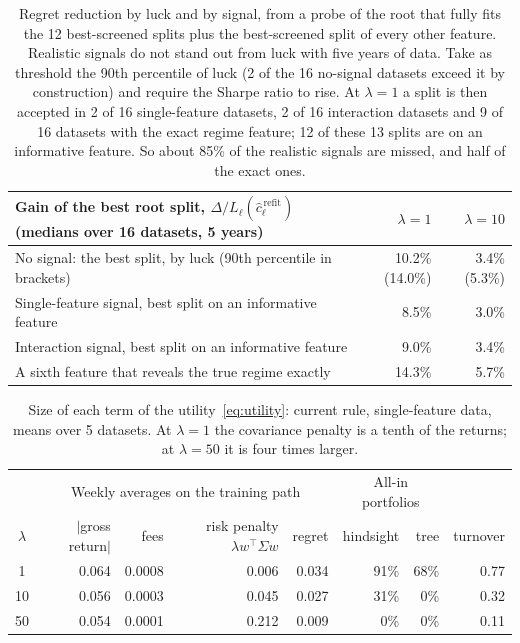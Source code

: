 \documentclass[11pt,a4paper]{article}
\newcommand{\1}{\mathbf{1}}
\begin{document}
\begin{table}[H]
\centering\small
\begin{tabularx}{\linewidth}{@{}L rr@{}}
\toprule
Gain of the best root split, $\Delta/L_\ell(\hat c^{\,\text{refit}}_\ell)$ (medians over 16 datasets, 5 years) & $\lambda=1$ & $\lambda=10$\\
\midrule
No signal: the best split, by luck (90th percentile in brackets) & 10.2\% (14.0\%) & 3.4\% (5.3\%)\\
Single-feature signal, best split on an informative feature & 8.5\% & 3.0\%\\
Interaction signal, best split on an informative feature & 9.0\% & 3.4\%\\
A sixth feature that reveals the true regime exactly & 14.3\% & 5.7\%\\
\bottomrule
\end{tabularx}
\caption{Regret reduction by luck and by signal, from a probe of the root that fully fits the 12 best-screened splits plus the best-screened split of every other feature. Realistic signals do not stand out from luck with five years of data. Take as threshold the 90th percentile of luck (2 of the 16 no-signal datasets exceed it by construction) and require the Sharpe ratio to rise. At $\lambda=1$ a split is then accepted in 2 of 16 single-feature datasets, 2 of 16 interaction datasets and 9 of 16 datasets with the exact regime feature; 12 of these 13 splits are on an informative feature. So about 85\% of the realistic signals are missed, and half of the exact ones.}
\label{tab:gate}
\end{table}

\begin{table}[H]
\centering\small
\begin{tabular}{@{}c rrrr rr r@{}}
\toprule
& \multicolumn{4}{c}{Weekly averages on the training path} & \multicolumn{2}{c}{All-in portfolios} &\\
\cmidrule(lr){2-5}\cmidrule(lr){6-7}
$\lambda$ & $|$gross return$|$ & fees & risk penalty $\lambda w^\top\Sigma w$ & regret & hindsight & tree & turnover\\
\midrule
1 & 0.064 & 0.0008 & 0.006 & 0.034 & 91\% & 68\% & 0.77\\
10 & 0.056 & 0.0003 & 0.045 & 0.027 & 31\% & 0\% & 0.32\\
50 & 0.054 & 0.0001 & 0.212 & 0.009 & 0\% & 0\% & 0.11\\
\bottomrule
\end{tabular}
\caption{Size of each term of the utility~\eqref{eq:utility}: current rule, single-feature data, means over 5 datasets. At $\lambda=1$ the covariance penalty is a tenth of the returns; at $\lambda=50$ it is four times larger.}
\label{tab:scale}
\end{table}
\end{document}
